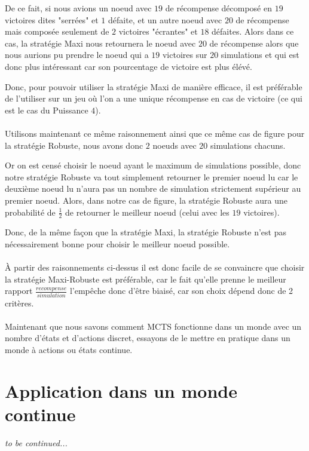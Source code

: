 \documentclass[pdftex,french, english]{article}	%
\begin{document}
De ce fait, si nous avions un noeud avec $19$ de récompense décomposé en $19$ victoires dites "serrées" et $1$ défaite, et un autre noeud avec $20$ de récompense mais composée seulement de $2$ victoires "écrantes" et $18$ défaites.
Alors dans ce cas, la stratégie Maxi nous retournera le noeud avec $20$ de récompense alors que nous aurions pu prendre le noeud qui a $19$ victoires sur $20$ simulations et qui est donc plus intéressant car son pourcentage de victoire est plus élévé.

Donc, pour pouvoir utiliser la stratégie Maxi de manière efficace, il est préférable de l'utiliser sur un jeu où l'on a une unique récompense en cas de victoire (ce qui est le cas du Puissance $4$).
\\ \\
Utilisons maintenant ce même raisonnement ainsi que ce même cas de figure pour la stratégie Robuste, nous avons donc $2$ noeuds avec $20$ simulations chacuns. 

Or on est censé choisir le noeud ayant le maximum de simulations possible, donc notre stratégie Robuste va tout simplement retourner le premier noeud lu car le deuxième noeud lu n'aura pas un nombre de simulation strictement supérieur au premier noeud. Alors, dans notre cas de figure, la stratégie Robuste aura une probabilité de $\frac{1}{2}$ de retourner le meilleur noeud (celui avec les $19$ victoires).

Donc, de la même façon que la stratégie Maxi, la stratégie Robuste n'est pas nécessairement bonne pour choisir le meilleur noeud possible.
\\ \\
À partir des raisonnements ci-dessus il est donc facile de se convaincre que choisir la stratégie Maxi-Robuste est préférable, car le fait qu'elle prenne le meilleur rapport $\frac{recompense}{simulation}$ l'empêche donc d'être biaisé, car son choix dépend donc de 2 critères.
\\ \\
Maintenant que nous savons comment MCTS fonctionne dans un monde avec un nombre d'états et d'actions discret, essayons de le mettre en pratique dans un monde à actions ou états continue.

\newpage
\section{Application dans un monde continue}
\textit{to be continued...}
\newpage
{}


\end{document}
